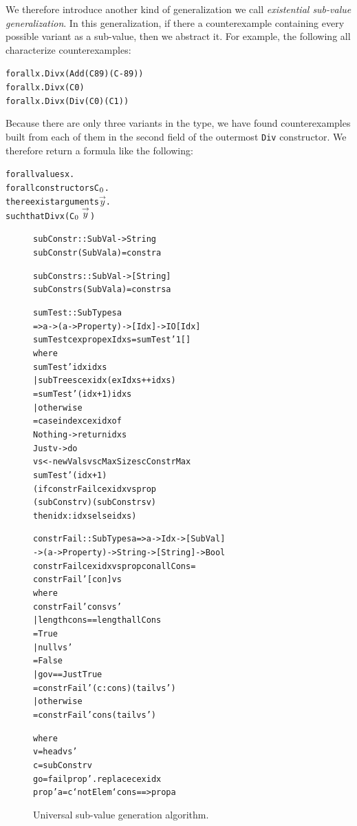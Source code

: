 \documentclass[10pt]{sigplanconf}
\newenvironment{code}{\begin{alltt}}{\end{alltt}}
\newcommand{\ttp}[1]{\texttt{#1}}
\begin{document}
We therefore introduce another kind of generalization we call \emph{existential
  sub-value generalization}.  In this generalization, if there a counterexample
containing every possible variant as a sub-value, then we abstract it.  For
example, the following all characterize counterexamples:
%
\begin{code}
forall x . Div x (Add (C 89) (C -89))
forall x . Div x (C 0)
forall x . Div x (Div (C 0) (C 1))
\end{code}
%
\noindent
Because there are only three variants in the type, we have found counterexamples
built from each of them in the second field of the outermost \ttp{Div}
constructor.  We therefore return a formula like the following:
%
\begin{code}
forall values x .
  forall constructors C\(\sb{0}\) .
    there exist arguments \(\stackrel{\rightarrow}{y}\) .
      such that Div x (C\(\sb{0} \stackrel{\rightarrow}{y}\))
\end{code}
%

\begin{figure}
  \begin{code}
subConstr :: SubVal -> String
subConstr (SubVal a) = constr a

subConstrs :: SubVal -> [String]
subConstrs (SubVal a) = constrs a

sumTest :: SubTypes a
          => a -> (a -> Property) -> [Idx] -> IO [Idx]
sumTest cex prop exIdxs = sumTest' 1 []
  where
  sumTest' idx idxs
    | subTrees cex idx (exIdxs ++ idxs)
    = sumTest' (idx+1) idxs
    | otherwise
    = case index cex idx of
        Nothing -> return idxs
        Just v  -> do
          vs <- newVals v scMaxSize scConstrMax
          sumTest' (idx+1)
            (if constrFail cex idx vs prop
                  (subConstr v) (subConstrs v)
               then idx:idxs else idxs)

constrFail :: SubTypes a => a -> Idx -> [SubVal]
  -> (a -> Property) -> String -> [String] -> Bool
constrFail cex idx vs prop con allCons =
  constrFail' [con] vs
  where
  constrFail' cons vs'
    | length cons == length allCons
    = True
    | null vs'
    = False
    | go v == Just True
    = constrFail' (c:cons) (tail vs')
    | otherwise
    = constrFail' cons (tail vs')

    where
    v  = head vs'
    c  = subConstr v
    go = fail prop' . replace cex idx
    prop' a = c `notElem` cons ==> prop a
  \end{code}
  \caption{Universal sub-value generation algorithm.}
  \label{fig:constrs}
\end{figure}
\end{document}
